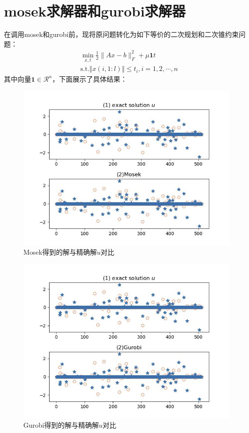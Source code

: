 \documentclass[12pt]{article}
\begin{document}
	\section{mosek求解器和gurobi求解器}
	
	在调用mosek和gurobi前，现将原问题转化为如下等价的二次规划和二次锥约束问题：
	\begin{equation*}
		\begin{aligned}
			&\min \limits_{x,t} \frac{1}{2}\|A x-b\|_F^2 + \mu \textbf{1} t\\
			&\mathrm{s.t.} \Vert x(i,1:l) \Vert \leq t_i, i = 1,2,\cdots, n
		\end{aligned}
	\end{equation*}    
其中向量$  \textbf{1}  \in \mathcal{R}^{n}$，下面展示了具体结果：                          
		\begin{figure}[H]
		\centering
		\includegraphics[width=\textwidth]{figs/Mosek.jpg}
		\caption{Mosek得到的解与精确解$u$对比}
	\end{figure}
	\begin{figure}[H]
		\centering
		\includegraphics[width=\textwidth]{figs/Gurobi.jpg}
		\caption{Gurobi得到的解与精确解$u$对比}
	\end{figure}
\end{document}

